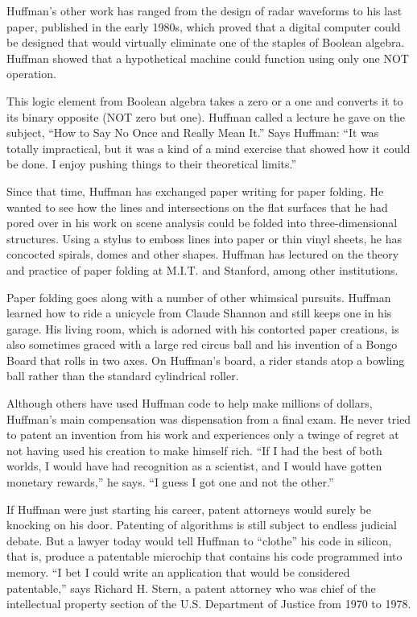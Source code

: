 Huffman's other work has ranged from the design of radar waveforms to his 
last paper, published in the early 1980s, which proved that a digital computer 
could be designed that would virtually eliminate one of the staples of Boolean 
algebra. Huffman showed that a hypothetical machine could function using 
only one NOT operation.

This logic element from Boolean algebra takes a zero or a one and converts 
it to its binary opposite (NOT zero but one). Huffman called a lecture he 
gave on the subject, ``How to Say No Once and Really Mean It.'' Says Huffman: 
``It was totally impractical, but it was a kind of a mind exercise that showed 
how it could be done. I enjoy pushing things to their theoretical limits.''

Since that time, Huffman has exchanged paper writing for paper folding. He 
wanted to see how the lines and intersections on the flat surfaces that he 
had pored over in his work on scene analysis could be folded into three-dimensional 
structures. Using a stylus to emboss lines into paper or thin vinyl sheets, 
he has concocted spirals, domes and other shapes. Huffman has lectured on 
the theory and practice of paper folding at M.I.T. and Stanford, among other 
institutions.

Paper folding goes along with a number of other whimsical pursuits. Huffman 
learned how to ride a unicycle from Claude Shannon and still keeps one in 
his garage. His living room, which is adorned with his contorted paper creations, 
is also sometimes graced with a large red circus ball and his invention of 
a Bongo Board that rolls in two axes. On Huffman's board, a rider stands 
atop a bowling ball rather than the standard cylindrical roller.

Although others have used Huffman code to help make millions of dollars, 
Huffman's main compensation was dispensation from a final exam. He never 
tried to patent an invention from his work and experiences only a twinge 
of regret at not having used his creation to make himself rich. ``If I had 
the best of both worlds, I would have had recognition as a scientist, and 
I would have gotten monetary rewards,'' he says. ``I guess I got one and 
not the other.''

If Huffman were just starting his career, patent attorneys would surely be 
knocking on his door. Patenting of algorithms is still subject to endless 
judicial debate. But a lawyer today would tell Huffman to ``clothe'' his 
code in silicon, that is, produce a patentable microchip that contains his 
code programmed into memory. ``I bet I could write an application that would 
be considered patentable,'' says Richard H. Stern, a patent attorney who 
was chief of the intellectual property section of the U.S. Department of 
Justice from 1970 to 1978.

